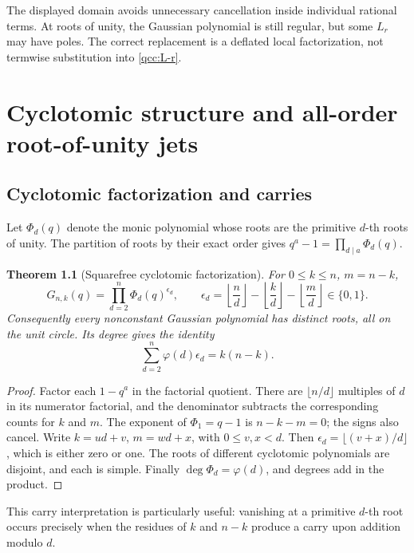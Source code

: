 \documentclass[11pt,a4paper,oneside,openany]{book}
\newtheorem{theorem}{Theorem}[chapter]
\theoremstyle{definition}
\theoremstyle{remark}
\begin{document}
The displayed domain avoids unnecessary cancellation inside individual rational
terms. At roots of unity, the Gaussian polynomial is still regular, but some
\(L_r\) may have poles. The correct replacement is a deflated local
factorization, not termwise substitution into \eqref{qcc:L-r}.

\chapter{Cyclotomic structure and all-order root-of-unity jets}
\label{qcc:roots}
\section{Cyclotomic factorization and carries}
Let \(\Phi_d(q)\) denote the monic polynomial whose roots are the primitive
\(d\)-th roots of unity. The partition of roots by their exact order gives
\(q^a-1=\prod_{d\mid a}\Phi_d(q)\).

\begin{theorem}[Squarefree cyclotomic factorization]\label{qcc:cyclotomic}
For \(0\le k\le n\), \(m=n-k\),
\begin{equation}\label{qcc:cyclotomic-product}
 G_{n,k}(q)=\prod_{d=2}^{n}\Phi_d(q)^{\epsilon_d},\qquad
 \epsilon_d=\left\lfloor\frac nd\right\rfloor
      -\left\lfloor\frac kd\right\rfloor
      -\left\lfloor\frac md\right\rfloor\in\{0,1\}.
\end{equation}
Consequently every nonconstant Gaussian polynomial has distinct roots, all on
the unit circle. Its degree gives the identity
\begin{equation}\label{qcc:totient-degree}
 \sum_{d=2}^{n}\varphi(d)\epsilon_d=k(n-k).
\end{equation}
\end{theorem}
\begin{proof}
Factor each \(1-q^a\) in the factorial quotient. There are
\(\lfloor n/d\rfloor\) multiples of \(d\) in its numerator factorial,
and the denominator subtracts the corresponding counts for \(k\) and \(m\).
The exponent of \(\Phi_1=q-1\) is \(n-k-m=0\); the signs also cancel.
Write \(k=ud+v\), \(m=wd+x\), with \(0\le v,x<d\). Then
\(\epsilon_d=\lfloor(v+x)/d\rfloor\), which is either zero or one.
The roots of different cyclotomic polynomials are disjoint, and each is simple.
Finally \(\deg\Phi_d=\varphi(d)\), and degrees add in the product.
\end{proof}
This carry interpretation is particularly useful: vanishing at a primitive
\(d\)-th root occurs precisely when the residues of \(k\) and \(n-k\)
produce a carry upon addition modulo \(d\).
\end{document}
